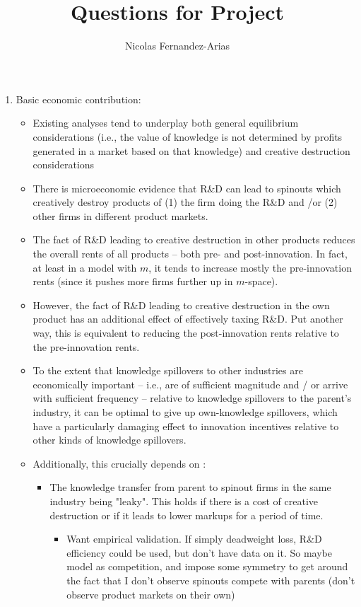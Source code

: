 \documentclass[12pt,english]{article}
\theoremstyle{remark}
\begin{document}
	
\title{Questions for Project}
\author{Nicolas Fernandez-Arias}
\maketitle

\begin{enumerate}
	\item Basic economic contribution:
	\begin{itemize}
		\item Existing analyses tend to underplay both general equilibrium considerations (i.e., the value of knowledge is not determined by profits generated in a market based on that knowledge) and creative destruction considerations
		\item There is microeconomic evidence that R\&D can lead to spinouts which creatively destroy products of (1) the firm doing the R\&D and /or (2) other firms in different product markets.
		\item The fact of R\&D leading to creative destruction in other products reduces the overall rents of all products -- both pre- and post-innovation. In fact, at least in a model with $m$, it tends to increase mostly the pre-innovation rents (since it pushes more firms further up in $m$-space).
		\item However, the fact of R\&D leading to creative destruction in the own product has an additional effect of effectively taxing R\&D. Put another way, this is equivalent to reducing the post-innovation rents relative to the pre-innovation rents.
		\item To the extent that knowledge spillovers to other industries are economically important -- i.e., are of sufficient magnitude and / or arrive with sufficient frequency -- relative to knowledge spillovers to the parent's industry, it can be optimal to give up own-knowledge spillovers, which have a particularly damaging effect to innovation incentives relative to other kinds of knowledge spillovers.
		\item Additionally, this crucially depends on :
		\begin{itemize}
			\item The knowledge transfer from parent to spinout firms in the same industry being "leaky". This holds if there is a cost of creative destruction or if it leads to lower markups for a period of time.
			\begin{itemize}
				\item Want empirical validation. If simply deadweight loss, R\&D efficiency could be used, but don't have data on it. So maybe model as competition, and impose some symmetry to get around the fact that I don't observe spinouts compete with parents (don't observe product markets on their own)

\end{itemize}
\end{itemize}
\end{itemize}
\end{enumerate}
\end{document}
